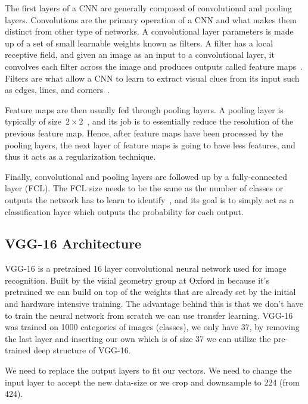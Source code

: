 The first layers of a CNN are generally composed of convolutional and pooling layers. Convolutions are the primary operation of a CNN and what makes them distinct from other type of networks. A convolutional layer parameters is made up of a set of small learnable weights known as filters. A filter has a local receptive field, and given an image as an input to a convolutional layer, it convolves each filter across the image and produces outputs called feature maps~\cite{cnn-star-galaxy}. Filters are what allow a CNN to learn to extract visual clues from its input such as edges, lines, and corners~\cite{Lecun99objectrecognition}.

Feature maps are then usually fed through pooling layers. A pooling layer is typically of size~$2 \times 2$~\cite{NIPS2012_4824}, and  its job is to essentially reduce the resolution of the previous feature map. Hence, after feature maps have been processed by the pooling layers, the next layer of feature maps is going to have less features, and thus it acts as a regularization technique.

Finally, convolutional and pooling layers are followed up by a fully-connected layer (FCL). The FCL size needs to be the same as the number of classes or outputs the network has to learn to identify~\cite{Ciresan11flexible}, and its goal is to simply act as a classification layer which outputs the probability for each output.

\subsection{VGG-16 Architecture}

VGG-16 is a pretrained 16 layer convolutional neural network used for image recognition. Built by the visial geometry group at Oxford in \citeyear{vgg16-arxiv} \cite{vgg16-arxiv} because it's pretrained we can build on top of the weights that are already set by the initial and hardware intensive training. The advantage behind this is that we don't have to train the neural network from scratch we can use transfer learning. VGG-16 was trained on 1000 categories of images (classes), we only have 37, by removing the last layer and inserting our own which is of size 37 we can utilize the pre-trained deep structure of VGG-16.


We need to replace the output layers to fit our vectors.
We need to change the input layer to accept the new data-size or we crop and downsample to 224 (from 424).
